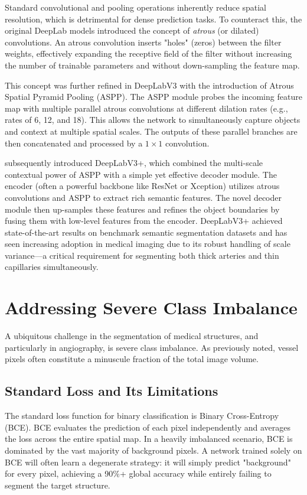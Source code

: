 Standard convolutional and pooling operations inherently reduce spatial resolution, which is detrimental for dense prediction tasks. To counteract this, the original DeepLab models introduced the concept of \textit{atrous} (or dilated) convolutions. An atrous convolution inserts "holes" (zeros) between the filter weights, effectively expanding the receptive field of the filter without increasing the number of trainable parameters and without down-sampling the feature map.

This concept was further refined in DeepLabV3 with the introduction of Atrous Spatial Pyramid Pooling (ASPP). The ASPP module probes the incoming feature map with multiple parallel atrous convolutions at different dilation rates (e.g., rates of 6, 12, and 18). This allows the network to simultaneously capture objects and context at multiple spatial scales. The outputs of these parallel branches are then concatenated and processed by a $1 \times 1$ convolution.

\textcite{chen2018encoder} subsequently introduced DeepLabV3+, which combined the multi-scale contextual power of ASPP with a simple yet effective decoder module. The encoder (often a powerful backbone like ResNet or Xception) utilizes atrous convolutions and ASPP to extract rich semantic features. The novel decoder module then up-samples these features and refines the object boundaries by fusing them with low-level features from the encoder. DeepLabV3+ achieved state-of-the-art results on benchmark semantic segmentation datasets and has seen increasing adoption in medical imaging due to its robust handling of scale variance---a critical requirement for segmenting both thick arteries and thin capillaries simultaneously.

\section{Addressing Severe Class Imbalance}
A ubiquitous challenge in the segmentation of medical structures, and particularly in angiography, is severe class imbalance. As previously noted, vessel pixels often constitute a minuscule fraction of the total image volume.

\subsection{Standard Loss and Its Limitations}
The standard loss function for binary classification is Binary Cross-Entropy (BCE). BCE evaluates the prediction of each pixel independently and averages the loss across the entire spatial map. In a heavily imbalanced scenario, BCE is dominated by the vast majority of background pixels. A network trained solely on BCE will often learn a degenerate strategy: it will simply predict "background" for every pixel, achieving a 90\%+ global accuracy while entirely failing to segment the target structure.

